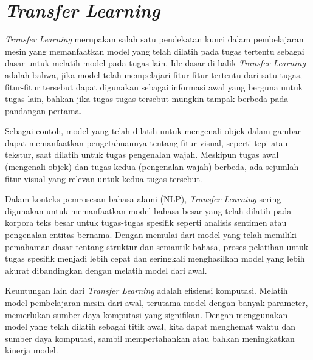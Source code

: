 \section{\textit{Transfer Learning}}

\textit{Transfer Learning} merupakan salah satu pendekatan kunci dalam pembelajaran mesin yang memanfaatkan model yang telah dilatih pada tugas tertentu sebagai dasar untuk melatih model pada tugas lain. Ide dasar di balik \textit{Transfer Learning} adalah bahwa, jika model telah mempelajari fitur-fitur tertentu dari satu tugas, fitur-fitur tersebut dapat digunakan sebagai informasi awal yang berguna untuk tugas lain, bahkan jika tugas-tugas tersebut mungkin tampak berbeda pada pandangan pertama.

Sebagai contoh, model yang telah dilatih untuk mengenali objek dalam gambar dapat memanfaatkan pengetahuannya tentang fitur visual, seperti tepi atau tekstur, saat dilatih untuk tugas pengenalan wajah. Meskipun tugas awal (mengenali objek) dan tugas kedua (pengenalan wajah) berbeda, ada sejumlah fitur visual yang relevan untuk kedua tugas tersebut.

Dalam konteks pemrosesan bahasa alami (NLP), \textit{Transfer Learning} sering digunakan untuk memanfaatkan model bahasa besar yang telah dilatih pada korpora teks besar untuk tugas-tugas spesifik seperti analisis sentimen atau pengenalan entitas bernama. Dengan memulai dari model yang telah memiliki pemahaman dasar tentang struktur dan semantik bahasa, proses pelatihan untuk tugas spesifik menjadi lebih cepat dan seringkali menghasilkan model yang lebih akurat dibandingkan dengan melatih model dari awal.

Keuntungan lain dari \textit{Transfer Learning} adalah efisiensi komputasi. Melatih model pembelajaran mesin dari awal, terutama model dengan banyak parameter, memerlukan sumber daya komputasi yang signifikan. Dengan menggunakan model yang telah dilatih sebagai titik awal, kita dapat menghemat waktu dan sumber daya komputasi, sambil mempertahankan atau bahkan meningkatkan kinerja model.

